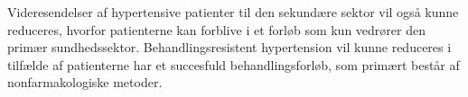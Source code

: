 Videresendelser af hypertensive patienter til den sekundære sektor vil også kunne reduceres, hvorfor patienterne kan forblive i et forløb som kun vedrører den primær sundhedssektor. Behandlingsresistent hypertension vil kunne reduceres i tilfælde af patienterne har et succesfuld behandlingsforløb, som primært består af nonfarmakologiske metoder.  %













\begin{comment}
Hvad koster et Fitbit Flex? 
Hvilke besparelser tilbydes der så sundhedsektoren? 

Hvad koster det så at introducere patienterne til teknologien? 
	Hvad dækker den her introduktion minimum over, for at kunne anvende armbåndet? (Anvendelse af app og hvordan den skal oplades.)
	
Hvad koster det hvis de har spørgsmål vedr. teknologien? 


Langsigtet omkostninger - hvis behandlingen hjælper/ikke hjælper
- Besparelser vedr. medicinering 
- Besparelser vedr. ambulant forløb 
- Forebyggelse af behandlingsresistent hypertension = $$$$



EVT: Dags-takster i sekundær sektor (Ambulant).



En model i almen praktsis for implementeringen af aktivitetsarmbånd?

Honorartabel = \citep{honorartabel2016}
\end{comment}